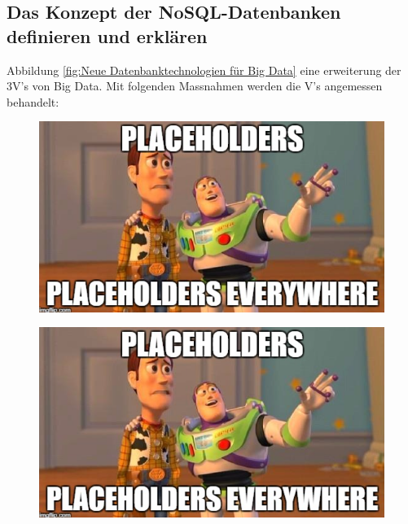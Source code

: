 \subsection{Das Konzept der NoSQL-Datenbanken definieren und erklären}



Abbildung \ref{fig:Neue Datenbanktechnologien für Big Data} eine erweiterung der 3V's von Big Data. Mit folgenden Massnahmen werden die V's angemessen behandelt:


\begin{figure} [H]
\centering
\begin{minipage}{0.5\textwidth}
  \centering
  \includegraphics[width=0.95\linewidth]{9_Template/Bilder/Placeholder.png}
  \label{fig:Neue Datenbanktechnologien für Big Data}
\end{minipage}%
\begin{minipage}{0.5\textwidth}
  \centering
  \includegraphics[width=0.95\linewidth]{9_Template/Bilder/Placeholder.png}
  \label{fig:NoSQL Datenbankmodelle}
\end{minipage}
\label{fig: NoSQL Datenbanken}
\end{figure}

